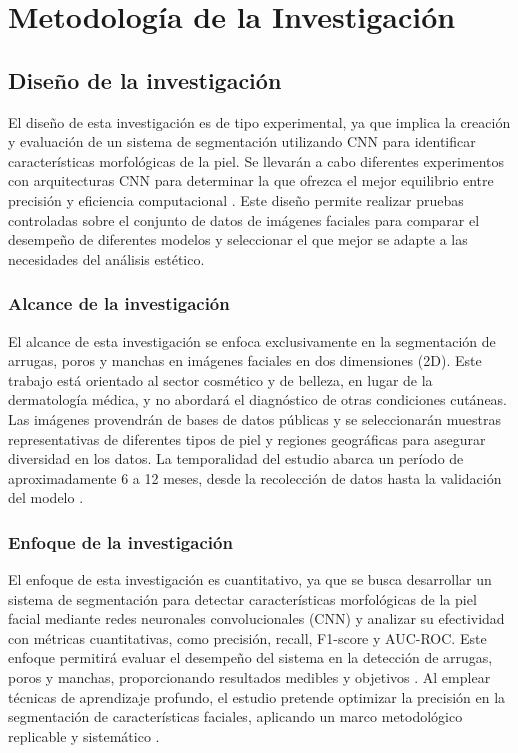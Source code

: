 \chapter{Metodología de la Investigación}
\section{Diseño de la investigación}

El diseño de esta investigación es de tipo experimental, ya que implica la creación y evaluación de un sistema de segmentación utilizando CNN para identificar características morfológicas de la piel. Se llevarán a cabo diferentes experimentos con arquitecturas CNN para determinar la que ofrezca el mejor equilibrio entre precisión y eficiencia computacional \cite{esteva2017, khatri2018}. Este diseño permite realizar pruebas controladas sobre el conjunto de datos de imágenes faciales para comparar el desempeño de diferentes modelos y seleccionar el que mejor se adapte a las necesidades del análisis estético.


\subsection{Alcance de la investigación}
El alcance de esta investigación se enfoca exclusivamente en la segmentación de arrugas, poros y manchas en imágenes faciales en dos dimensiones (2D). Este trabajo está orientado al sector cosmético y de belleza, en lugar de la dermatología médica, y no abordará el diagnóstico de otras condiciones cutáneas. Las imágenes provendrán de bases de datos públicas y se seleccionarán muestras representativas de diferentes tipos de piel y regiones geográficas para asegurar diversidad en los datos. La temporalidad del estudio abarca un período de aproximadamente 6 a 12 meses, desde la recolección de datos hasta la validación del modelo \cite{statista2023, aad2022}.

\subsection{Enfoque de la investigación}
El enfoque de esta investigación es cuantitativo, ya que se busca desarrollar un sistema de segmentación para detectar características morfológicas de la piel facial mediante redes neuronales convolucionales (CNN) y analizar su efectividad con métricas cuantitativas, como precisión, recall, F1-score y AUC-ROC. Este enfoque permitirá evaluar el desempeño del sistema en la detección de arrugas, poros y manchas, proporcionando resultados medibles y objetivos \cite{esteva2017, jia2019}. Al emplear técnicas de aprendizaje profundo, el estudio pretende optimizar la precisión en la segmentación de características faciales, aplicando un marco metodológico replicable y sistemático \cite{phillips2020}.

